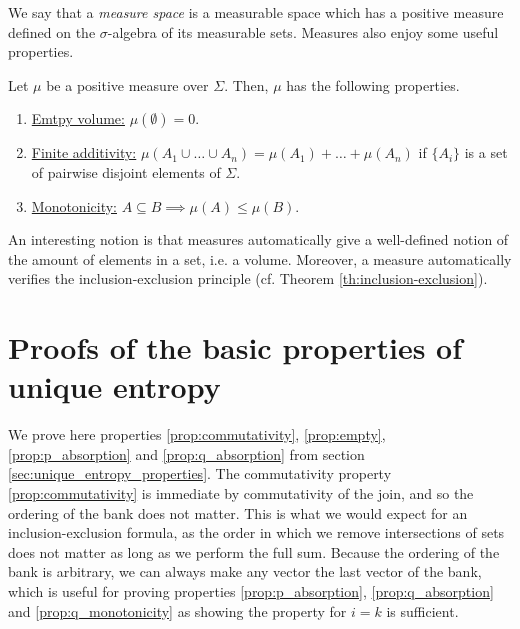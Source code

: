 We say that a \textit{measure space} is a measurable space which has a positive measure defined on the $\sigma$-algebra of its measurable sets. Measures also enjoy some useful properties.

\begin{appendix_theorem}
    Let $\mu$ be a positive measure over $\Sigma$. Then, $\mu$ has the following properties.
    \begin{enumerate}
        \item \underline{Emtpy volume:} $\mu(\emptyset) = 0$.
        \item \underline{Finite additivity:} $\mu(A_1 \cup \dots \cup A_n) = \mu(A_1) + \dots + \mu(A_n)$ if $\{A_i\}$ is a set of pairwise disjoint elements of $\Sigma$.
        \item \underline{Monotonicity:} $A \subseteq B \implies \mu(A) \leq \mu(B)$.
    \end{enumerate}
\end{appendix_theorem}

An interesting notion is that measures automatically give a well-defined notion of the amount of elements in a set, i.e. a volume. Moreover, a measure automatically verifies the inclusion-exclusion principle (cf. Theorem \ref{th:inclusion-exclusion}).



\newpage

\section{Proofs of the basic properties of unique entropy} \label{app:unique_entropy_properties}

\setcounter{equation}{0}

We prove here properties \ref{prop:commutativity}, \ref{prop:empty}, \ref{prop:p_absorption} and \ref{prop:q_absorption} from section \ref{sec:unique_entropy_properties}. The commutativity property \ref{prop:commutativity} is immediate by commutativity of the join, and so the ordering of the bank does not matter. This is what we would expect for an inclusion-exclusion formula, as the order in which we remove intersections of sets does not matter as long as we perform the full sum. Because the ordering of the bank is arbitrary, we can always make any vector the last vector of the bank, which is useful for proving properties \ref{prop:p_absorption}, \ref{prop:q_absorption} and \ref{prop:q_monotonicity} as showing the property for $i = k$ is sufficient.

